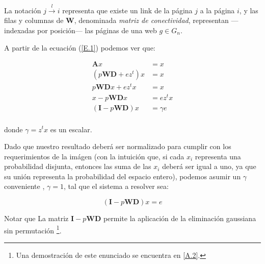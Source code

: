 \noindent La notación $j \stackrel{l}{\longrightarrow} i$ representa que existe un link de la página $j$ a la página $i$, y las filas y columnas de $\textbf{W}$, denominada \textit{matriz de conectividad}, representan ---indexadas por posición--- las páginas de una web $g \in G_n$.
\vspace{1em}

\noindent A partir de la ecuación (\ref{E.1}) podemos ver que:

\begin{align*}
    \textbf{A}x &= x \\
    (p\textbf{W}\textbf{D} + ez^t)x &= x \\
    p\textbf{W}\textbf{D}x + ez^tx &= x \\
    x - p\textbf{W}\textbf{D}x &= ez^tx \\
    (\textbf{I} - p\textbf{W}\textbf{D})x &= \gamma e \\
\end{align*}

\noindent donde $\gamma = z^tx$ es un escalar.
\vspace{1em}

Dado que nuestro resultado deberá ser normalizado para cumplir con los requerimientos de la imágen (con la intuición que, si cada $x_i$ representa una probabilidad disjunta, entonces las suma de las $x_i$ deberá ser igual a uno, ya que su unión representa la probabilidad del espacio entero), podemos asumir un $\gamma$ conveniente \cite{Langville04}, $\gamma = 1$, tal que el sistema a resolver sea:
\vspace{1em}

\begin{equation}\label{E.2}
    (\textbf{I} - p\textbf{W}\textbf{D})x = e
\end{equation}
\vspace{1em}

Notar que La matriz $\textbf{I} - p\textbf{W}\textbf{D}$  permite la aplicación de la eliminación gaussiana sin permutación \footnote{Una demostración de este enunciado se encuentra en \ref{A.2}.}.
